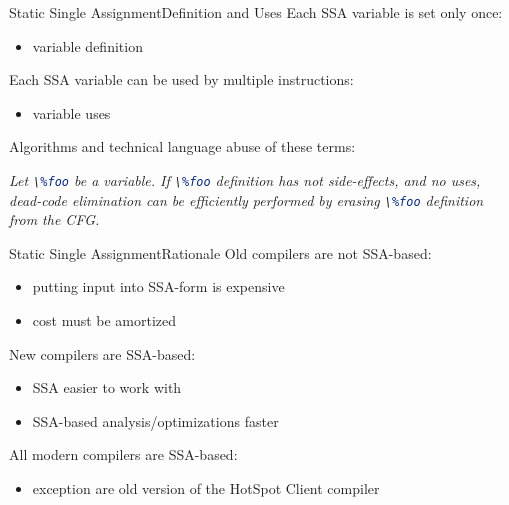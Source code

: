 \documentclass[10pt,mathserif]{beamer}
\newcommand{\llvminline}[1]{\lstinline[language=LLVM]!#1!}
\begin{document}
\begin{frame}{Static Single Assignment}{Definition and Uses}
Each SSA variable is set only once:

\begin{itemize}
\item variable \alert{definition}
\end{itemize}

\vfill
Each SSA variable can be used by multiple instructions:

\begin{itemize}
\item variable \alert{uses}
\end{itemize}

\vfill
Algorithms and technical language abuse of these terms:

\vfill
\emph{
Let \llvminline{\%foo} be a variable. If \llvminline{\%foo} definition has not
side-effects, and no uses, dead-code elimination can be efficiently performed
by erasing \llvminline{\%foo} definition from the CFG.
}
\end{frame}

\begin{frame}{Static Single Assignment}{Rationale}
Old compilers are not SSA-based:

\begin{itemize}
\item putting input into SSA-form is expensive
\item cost must be amortized
\end{itemize}

\vfill
New compilers are SSA-based:

\begin{itemize}
\item SSA easier to work with
\item SSA-based analysis/optimizations faster
\end{itemize}

\vfill
All modern compilers are SSA-based:

\begin{itemize}
\item exception are old version of the HotSpot Client compiler
\end{itemize}
\end{frame}
\end{document}
